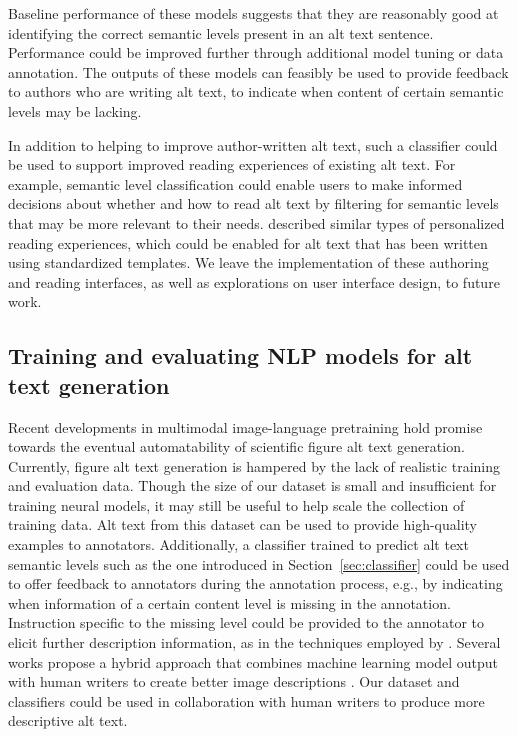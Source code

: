 \documentclass[sigconf]{acmart}
\begin{document}
Baseline performance of these models suggests that they are reasonably good at identifying the correct semantic levels present in an alt text sentence. Performance could be improved further through additional model tuning or data annotation. The outputs of these models can feasibly be used to provide feedback to authors who are writing alt text, to indicate when content of certain semantic levels may be lacking. 

In addition to helping to improve author-written alt text, such a classifier could be used to support improved reading experiences of existing alt text. For example, semantic level classification could enable users to make informed decisions about whether and how to read alt text by filtering for semantic levels that may be more relevant to their needs.
\citet{Morash2015GuidingNW} described similar types of personalized reading experiences, which could be enabled for alt text that has been written using standardized templates.
 We leave the implementation of these authoring and reading interfaces, as well as explorations on user interface design, to future work.


\subsection{Training and evaluating NLP models for alt text generation}
\label{sec:generation}

Recent developments in multimodal image-language pretraining \citep{Lu2019ViLBERTPT, Zhou2020UnifiedVP, Li2019VisualBERTAS} hold promise towards the eventual automatability of scientific figure alt text generation. Currently, figure alt text generation is hampered by the lack of realistic training and evaluation data. Though the size of our dataset is small and insufficient for training neural models, it may still be useful to help scale the collection of training data. Alt text from this dataset can be used to provide high-quality examples to annotators. Additionally, a classifier trained to predict alt text semantic levels such as the one introduced in Section~\ref{sec:classifier} could be used to offer feedback to annotators during the annotation process, e.g., by indicating when information of a certain content level is missing in the annotation. Instruction specific to the missing level could be provided to the annotator to elicit further description information, as in the techniques employed by \citet{Morash2015GuidingNW}. Several works propose a hybrid approach that combines machine learning model output with human writers to create better image descriptions \citep{qian-formative, Mack2021DesigningTF, Gurari2018VizWizGC}. Our dataset and classifiers could be used in collaboration with human writers to produce more descriptive alt text.
\end{document}
